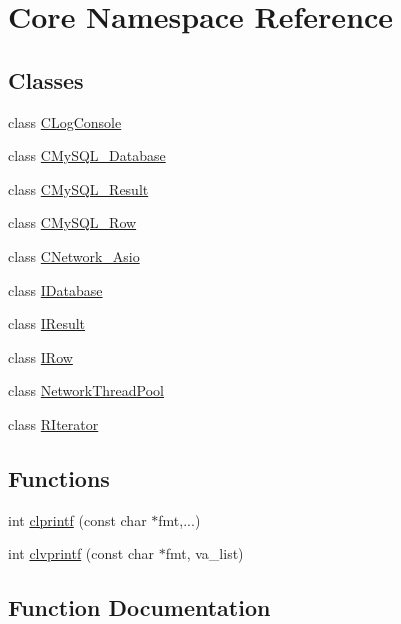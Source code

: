 \hypertarget{namespaceCore}{}\section{Core Namespace Reference}
\label{namespaceCore}
\subsection*{Classes}
\begin{DoxyCompactItemize}
\item 
class \hyperlink{classCore_1_1CLogConsole}{C\+Log\+Console}
\item 
class \hyperlink{classCore_1_1CMySQL__Database}{C\+My\+S\+Q\+L\+\_\+\+Database}
\item 
class \hyperlink{classCore_1_1CMySQL__Result}{C\+My\+S\+Q\+L\+\_\+\+Result}
\item 
class \hyperlink{classCore_1_1CMySQL__Row}{C\+My\+S\+Q\+L\+\_\+\+Row}
\item 
class \hyperlink{classCore_1_1CNetwork__Asio}{C\+Network\+\_\+\+Asio}
\item 
class \hyperlink{classCore_1_1IDatabase}{I\+Database}
\item 
class \hyperlink{classCore_1_1IResult}{I\+Result}
\item 
class \hyperlink{classCore_1_1IRow}{I\+Row}
\item 
class \hyperlink{classCore_1_1NetworkThreadPool}{Network\+Thread\+Pool}
\item 
class \hyperlink{classCore_1_1RIterator}{R\+Iterator}
\end{DoxyCompactItemize}
\subsection*{Functions}
\begin{DoxyCompactItemize}
\item 
int \hyperlink{namespaceCore_ac841f812f5ff61ba38222f7d441509d3}{clprintf} (const char $\ast$fmt,...)
\item 
int \hyperlink{namespaceCore_a630dcb213704b7856eec935d8695ffe9}{clvprintf} (const char $\ast$fmt, va\+\_\+list)
\end{DoxyCompactItemize}


\subsection{Function Documentation}
